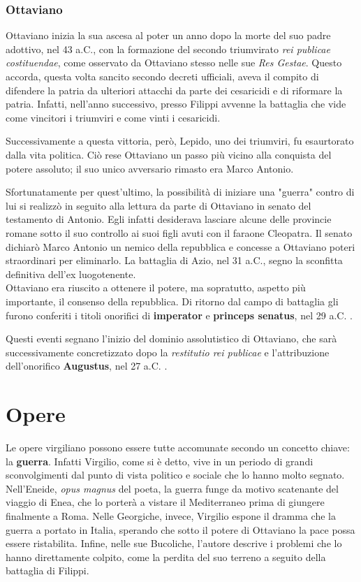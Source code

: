 \documentclass[10pt,a4paper]{article}
\begin{document}
	\subsubsection*{Ottaviano}
	
	Ottaviano inizia la sua ascesa al poter un anno dopo la morte del suo padre adottivo, nel 43 a.C., con la formazione del secondo triumvirato \textit{rei publicae costituendae}, come osservato da Ottaviano stesso nelle sue \textit{Res Gestae}. Questo accorda,  questa volta sancito secondo decreti ufficiali, aveva il compito di difendere la patria da ulteriori attacchi da parte dei cesaricidi e di riformare la patria. Infatti, nell'anno successivo, presso Filippi avvenne la battaglia che vide come vincitori i triumviri e come vinti i cesaricidi. 
	
	Successivamente a questa vittoria, però, Lepido, uno dei triumviri, fu esaurtorato dalla vita politica. Ciò rese Ottaviano un passo più vicino alla conquista del potere assoluto; il suo unico avversario rimasto era Marco Antonio.
	
	Sfortunatamente per quest'ultimo, la possibilità di iniziare una "guerra" contro di lui si realizzò in seguito alla lettura da parte di Ottaviano in senato del testamento di Antonio. Egli infatti desiderava lasciare alcune delle provincie romane sotto il suo controllo ai suoi figli avuti con il faraone Cleopatra. Il senato dichiarò Marco Antonio un nemico della repubblica e concesse a Ottaviano poteri straordinari per eliminarlo. La battaglia di Azio, nel 31 a.C., segno la sconfitta definitiva dell'ex luogotenente.\\
	
	Ottaviano era riuscito a ottenere il potere, ma sopratutto, aspetto più importante, il consenso della repubblica. Di ritorno dal campo di battaglia gli furono conferiti i titoli onorifici di \textbf{imperator} e \textbf{princeps senatus}, nel 29 a.C. .
	
	Questi eventi segnano l'inizio del dominio assolutistico di Ottaviano, che sarà successivamente concretizzato dopo la \textit{restitutio rei publicae} e l'attribuzione dell'onorifico \textbf{Augustus}, nel 27 a.C. .
	
	\section*{Opere}
	
	Le opere virgiliano possono essere tutte accomunate secondo un concetto chiave: la \textbf{guerra}. Infatti Virgilio, come si è detto, vive in un periodo di grandi sconvolgimenti dal punto di vista politico e sociale che lo hanno molto segnato. Nell'Eneide, \textit{opus magnus} del poeta, la guerra funge da motivo scatenante del viaggio di Enea, che lo porterà a vistare il Mediterraneo prima di giungere finalmente a Roma. Nelle Georgiche, invece, Virgilio espone il dramma che la guerra a portato in Italia, sperando che sotto il potere di Ottaviano la pace possa essere ristabilita. Infine, nelle sue Bucoliche, l'autore descrive i problemi che lo hanno direttamente colpito, come la perdita del suo terreno a seguito della battaglia di Filippi.
	
\end{document}
